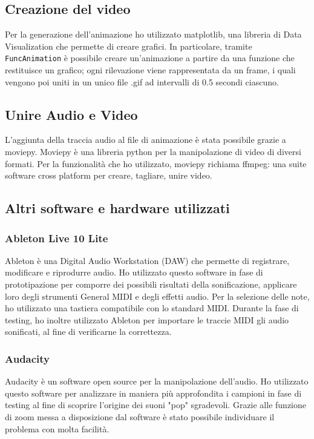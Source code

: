 \subsection{Creazione del video}
Per la generazione dell'animazione ho utilizzato matplotlib, una libreria di Data Visualization che permette di creare grafici.
In particolare, tramite \texttt{FuncAnimation} è possibile creare un'animazione a partire da una funzione che restituisce un grafico;
ogni rilevazione viene rappresentata da un frame, i quali vengono poi uniti in un unico file .gif ad intervalli di 0.5 secondi ciascuno.

\subsection{Unire Audio e Video}
L'aggiunta della traccia audio al file di animazione è stata possibile grazie a moviepy.
Moviepy è una libreria python per la manipolazione di video di diversi formati.
Per la funzionalità che ho utilizzato, moviepy richiama ffmpeg: una suite software cross platform per creare, tagliare, unire video.

\subsection{Altri software e hardware utilizzati}
\subsubsection{Ableton Live 10 Lite}
Ableton è una Digital Audio Workstation (DAW) che permette di registrare, modificare e riprodurre audio.
Ho utilizzato questo software in fase di prototipazione per comporre dei possibili risultati della sonificazione, applicare loro degli strumenti General MIDI e degli effetti audio.
Per la selezione delle note, ho utilizzato una tastiera compatibile con lo standard MIDI.
Durante la fase di testing, ho inoltre utilizzato Ableton per importare le traccie MIDI gli audio sonificati, al fine di verificarne la correttezza.
\subsubsection{Audacity}
Audacity è un software open source per la manipolazione dell'audio.
Ho utilizzato questo software per analizzare in maniera più approfondita i campioni in fase di testing al fine di scoprire l'origine dei suoni "pop" sgradevoli.
Grazie alle funzione di zoom messa a disposizione dal software è stato possibile individuare il problema con molta facilità.

